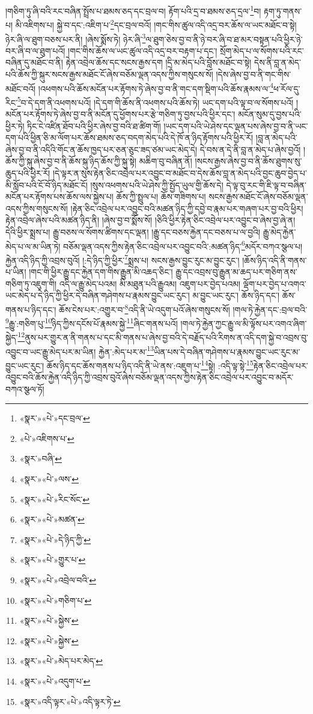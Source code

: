 །གཅིག་ཏུ་ཞི་བའི་རང་བཞིན་སྤྲོས་པ་ཐམས་ཅད་དང་བྲལ་བ། རྟོག་པའི་དྲ་བ་ཐམས་ཅད་དྲལ་\footnote{«སྣར་»«པེ་»དང་བྲལ་}བ། རྟག་ཏུ་གནས་པ། མི་འཇིགས་པ། སྐྱེ་བ་དང་:འཇིག་པ་\footnote{«པེ་»འཇིགས་པ་}དང་བྲལ་བའོ། །གང་གིས་ཚུལ་འདི་འདྲ་བར་ཆོས་ལ་ཡང་མཐོང་བ་སྟེ། ཉེར་ཞི་ལ་ཐུག་བཅས་པར་ནི། །ཞེས་སྨོས་ཏེ། ཉེར་ཞི་\footnote{«སྣར་»བཞི་}ལ་ཐུག་ཅེས་བྱ་བ་ནི་ཉེ་བར་ཞི་བ་ཐ་མར་བསྟན་པའི་ཕྱིར་ཉེ་བར་ཞི་བ་ལ་ཐུག་པའོ། །གང་གིས་ཆོས་ལ་ཡང་ཚུལ་འདི་འདྲ་བར་བརྟག་པ་དང་། སྲོག་མེད་པ་ལ་སོགས་པའི་རང་བཞིན་དུ་མཐོང་བ་ནི། རྟེན་འབྲེལ་ཆོས་དང་སངས་རྒྱས་དག །དྲི་མ་མེད་པའི་བློས་མཐོང་བ་སྟེ། དེས་ནི་བླ་ན་མེད་པའི་ཆོས་ཀྱི་སྐུར་སངས་རྒྱས་མཐོང་ངོ་ཞེས་བཅོམ་ལྡན་འདས་ཀྱིས་གསུངས་སོ། །དེས་ཞེས་བྱ་བ་ནི་གང་གིས་མཐོང་བའོ། །འཕགས་པའི་ཆོས་མངོན་པར་རྟོགས་ཏེ་ཞེས་བྱ་བ་ནི་གང་དག་སྡིག་པའི་ཆོས་རྣམས་ལ་\footnote{«སྣར་»«པེ་»ལས་}ཕ་རོལ་དུ་རིང་\footnote{«སྣར་»«པེ་»རིང་སོང་}བ་དེ་དག་ནི་འཕགས་པའོ། །དེ་དག་གི་ཆོས་ནི་འཕགས་པའི་ཆོས་ཏེ། ཡང་དག་པའི་ལྟ་བ་ལ་སོགས་པའོ། །མངོན་པར་རྟོགས་ཏེ་ཞེས་བྱ་བ་ནི་མངོན་དུ་ཕྱོགས་པར་རྩེ་གཅིག་ཏུ་བྱས་པའི་ཕྱིར་དང་། མངོན་སུམ་དུ་བྱས་པའི་ཕྱིར་ཏེ། ཏིང་ངེ་འཛིན་ཐོབ་པའི་ཕྱིར་ཞེས་བྱ་བའི་ཐ་ཚིག་གོ། །ཡང་དག་པའི་ཡེ་ཤེས་དང་ལྡན་པས་ཞེས་བྱ་བ་ནི་ཡང་དག་པའི་ཕྱིན་ཅི་མ་ལོག་པར་ཆོས་ཐམས་ཅད་བདག་མེད་པའི་དེ་ཁོ་ན་ཉིད་རྟོགས་པའི་ཕྱིར་རོ། །བླ་ན་མེད་པའི་ཞེས་བྱ་བ་ནི་འདིའི་གོང་ན་ཆོས་ཁྱད་པར་ཅན་ཅུང་ཟད་ཙམ་ཡང་མེད་དེ། དེ་བས་ན་དེ་ནི་བླ་ན་མེད་པ་ཞེས་བྱའོ། །ཆོས་ཀྱི་སྐུ་ཞེས་བྱ་བ་ནི་ཆོས་སྐུ་ཉིད་ཆོས་ཀྱི་སྐུ་སྟེ། མཆིག་བུ་བཞིན་ནོ། །སངས་རྒྱས་ཞེས་བྱ་བ་ནི་ཆོས་ཐུགས་སུ་ཆུད་པའི་ཕྱིར་རོ། །དེ་ལྟར་ན་སུས་རྟེན་ཅིང་འབྲེལ་པར་འབྱུང་བ་མཐོང་བ་དེས་ཆོས་བླ་ན་མེད་པའི་བྱང་ཆུབ་བྱེད་པ་མི་སློབ་པའི་ངོ་བོ་ཉིད་མཐོང་ངོ། །སུས་འཕགས་པའི་ཡེ་ཤེས་ཀྱི་སྤྱོད་ཡུལ་གྱི་ཆོས་དེ། དེ་ལྟ་བུ་རང་གི་ཇི་ལྟ་བ་བཞིན་མངོན་པར་རྟོགས་པས་ཆོས་ལས་སྐྱེས་པ། ཆོས་ཀྱི་སྤྲུལ་པ། ཆོས་གཟིགས་པ། སངས་རྒྱས་མཐོང་ངོ་ཞེས་བཅོམ་ལྡན་འདས་ཀྱིས་གསུངས་སོ། །རྟེན་ཅིང་འབྲེལ་པར་འབྱུང་བའི་མཚན་ཉིད་ཀྱི་དབྱེ་བ་རྣམ་པར་གཞག་པར་བྱ་བའི་ཕྱིར། རྟེན་འབྲེལ་ཞེས་པའི་མཚན་ཉིད་ནི། །ཞེས་བྱ་བ་སྨོས་སོ། །ཅིའི་ཕྱིར་རྟེན་ཅིང་འབྲེལ་པར་འབྱུང་བ་ཞེས་བྱ་ཞེ་ན། དེའི་ཕྱིར་སྨྲས་པ། རྒྱུ་བཅས་ལ་སོགས་ཚིགས་དང་ལྡན། །རྒྱུ་དང་བཅས་རྐྱེན་དང་བཅས་པ་ལ་བྱའི། རྒྱུ་མེད་རྐྱེན་མེད་པ་ལ་མ་ཡིན་ཏེ། བཅོམ་ལྡན་འདས་ཀྱིས་རྟེན་ཅིང་འབྲེལ་པར་འབྱུང་བའི་:མཚན་ཉིད་\footnote{«སྣར་»«པེ་»མཚན་}མདོར་བཀའ་སྩལ་པ། རྐྱེན་འདི་ཉིད་ཀྱི་འབྲས་བུའོ། །:དེ་ཉིད་ཀྱི་ཕྱིར་\footnote{«སྣར་»«པེ་»དེ་ཉིད་ཀྱི་}སྨྲས་པ། སངས་རྒྱས་བྱུང་རུང་མ་བྱུང་རུང་། །ཆོས་ཉིད་འདི་ནི་གནས་པ་ཡིན། །གང་གི་ཕྱིར་རྒྱུ་དང་རྐྱེན་དག་གིས་རྒྱུན་མི་འཆད་ཅིང་། རྒྱུ་དང་འབྲས་བུ་རྒྱུན་མ་ཆད་པར་གཅིག་ནས་གཅིག་ཏུ་འཇུག་གི། འདི་ལ་རྒྱུ་མེད་པའམ། མི་མཐུན་པའི་རྒྱུའམ། འཇུག་པར་བྱེད་པའམ། ལྡོག་པར་བྱེད་པ་འགའ་ཡང་མེད་པ་དེ་ཉིད་ཀྱི་ཕྱིར་དེ་བཞིན་གཤེགས་པ་རྣམས་བྱུང་ཡང་རུང་། མ་བྱུང་ཡང་རུང་། ཆོས་ཉིད་དང་། ཆོས་གནས་པ་ཉིད་དང་། ཆོས་ངེས་པར་:འགྱུར་བ་\footnote{«སྣར་»«པེ་»གྱུར་པ་}འདི་ནི་ཡེ་འདུག་པའོ་ཞེས་གསུངས་སོ། །གལ་ཏེ་རྐྱེན་དང་:བྲལ་བའི་\footnote{«སྣར་»«པེ་»འབྲེལ་བའི་}རྒྱུ་:གཅིག་པུ་\footnote{«སྣར་»«པེ་»གཅིག་པ་}ཉིད་ཀྱིས་དངོས་པོ་རྣམས་སྐྱེ་\footnote{«སྣར་»«པེ་»སྐྱེས་}ཞིང་གནས་པའོ། །གལ་ཏེ་རྐྱེན་ཀྱང་རྒྱུ་ལ་མི་ལྟོས་པར་འགའ་ཞིག་སྐྱེད་\footnote{«སྣར་»«པེ་»སྐྱེས་}ནུས་པར་གྱུར་ན་ནི་གནས་པ་དང་མི་གནས་པ་ཞེས་བྱ་བའི་དེ་བརྗོད་པའི་རིགས་ན་འདི་དག་སྐྱེ་བ་འབྲས་བུ་འབྱུང་བ་ཡང་རྒྱུ་མེད་པར་མ་ཡིན། རྐྱེན་:མེད་པར་མ་\footnote{«སྣར་»«པེ་»མེད་པར་མེད་}ཡིན་པས་དེ་བཞིན་གཤེགས་པ་རྣམས་བྱུང་ཡང་རུང་མ་བྱུང་ཡང་རུང་། ཆོས་ཉིད་དང་ཆོས་གནས་པ་ཉིད་འདི་ནི་ཡེ་ནས་:འཇུག་པ་\footnote{«སྣར་»«པེ་»འདུག་པ་}སྟེ། :འདི་ལྟ་སྟེ་\footnote{«སྣར་»འདི་ལྟར་«པེ་»འདི་ལྟར་ཏེ་}རྟེན་ཅིང་འབྲེལ་པར་འབྱུང་བའི་ཆོས་རྐྱེན་འདི་ཉིད་ཀྱི་འབྲས་བུའོ་ཞེས་བཅོམ་ལྡན་འདས་ཀྱིས་རྟེན་ཅིང་འབྲེལ་པར་འབྱུང་བ་མདོར་བཀའ་སྩལ་ཏོ། 